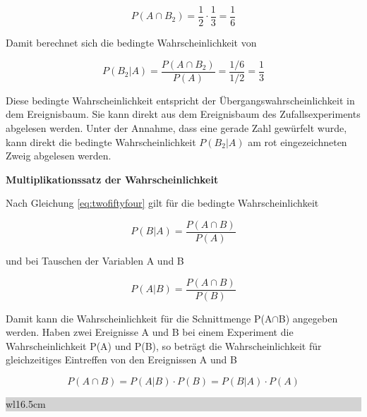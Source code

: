 \begin{equation}\label{eq:twofiftysix}
P(A\cap B_{2} )=\dfrac{1}{2} \cdot \dfrac{1}{3} =\dfrac{1}{6}
\end{equation}

\noindent Damit berechnet sich die bedingte Wahrscheinlichkeit von

\begin{equation}\label{eq:twofiftyseven}
P(B_{2} |A)=\dfrac{P(A\cap B_{2})}{P(A)} =\dfrac{1/6}{1/2} =\dfrac{1}{3}
\end{equation}

\noindent Diese bedingte Wahrscheinlichkeit entspricht der \"{U}bergangswahrscheinlichkeit in dem Ereignisbaum. Sie kann direkt aus dem Ereignisbaum des Zufallsexperiments abgelesen werden. Unter der Annahme, dass eine gerade Zahl gew\"{u}rfelt wurde, kann direkt die bedingte Wahrscheinlichkeit $P(B_{2}|A)$ am rot eingezeichneten Zweig abgelesen werden.\bigskip

{\selectfont
\noindent\textbf{Multiplikationssatz der Wahrscheinlichkeit}} \smallskip

\noindent Nach Gleichung \eqref{eq:twofiftyfour} gilt f\"{u}r die bedingte Wahrscheinlichkeit 

\begin{equation}\label{eq:twofiftyeight}
P(B|A)=\dfrac{P(A\cap B)}{P(A)}
\end{equation}

\noindent und bei Tauschen der Variablen A und B 

\begin{equation}\label{eq:twofiftynine}
P(A|B)=\dfrac{P(A\cap B)}{P(B)}
\end{equation}

\noindent Damit kann die Wahrscheinlichkeit f\"{u}r die Schnittmenge P(A$\cap$B) angegeben werden. Haben zwei Ereignisse A und B bei einem Experiment die Wahrscheinlichkeit P(A) und P(B), so betr\"{a}gt die Wahrscheinlichkeit f\"{u}r gleichzeitiges Eintreffen von den Ereignissen A und B 

\begin{equation}\label{eq:twosixty}
P(A\cap B)=P(A|B)\cdot P(B)=P(B|A)\cdot P(A)
\end{equation}

\noindent
\colorbox{lightgray}{%
%
\renewcommand\arraystretch{0.6}%
\begin{tabular}{ wl{16.5cm} }
{\selectfont
{}}
\end{tabular}%
}\bigskip

